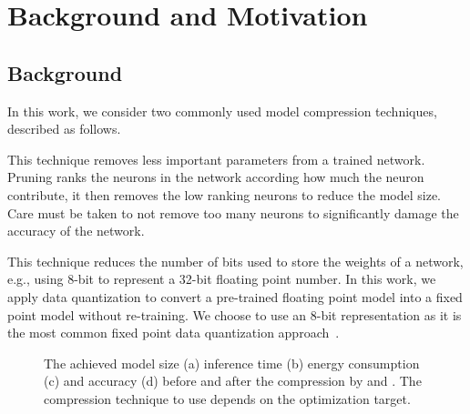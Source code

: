 
\section{Background and Motivation}
\subsection{Background}
In this work, we consider two commonly used model compression techniques, described as follows.

 This technique removes less important parameters from a trained network. Pruning ranks the neurons in the network
according how much the neuron contribute, it then removes the low ranking neurons to reduce the model size. Care must be taken to not
remove too many neurons to significantly damage the accuracy of the network.

 This technique reduces the number of bits used to store the weights of a network, e.g., using 8-bit to
represent a 32-bit floating point number. In this work, we apply data quantization to convert a pre-trained floating point model into a
fixed point model without re-training. We choose to use an 8-bit representation as it is the most common fixed point data quantization
approach~\FIXME{\cite{}}.

\begin{figure}[!t]
\centering
{}
\hfill
{}
\hfill
{}
\hfill
{}
\hfill
\caption{The achieved model size (a) inference time (b) energy consumption (c) and accuracy (d) before and after the compression by \quantization and \pruning.
The compression technique to use depends on the optimization target.}
\label{fig:motivation}
\end{figure}

